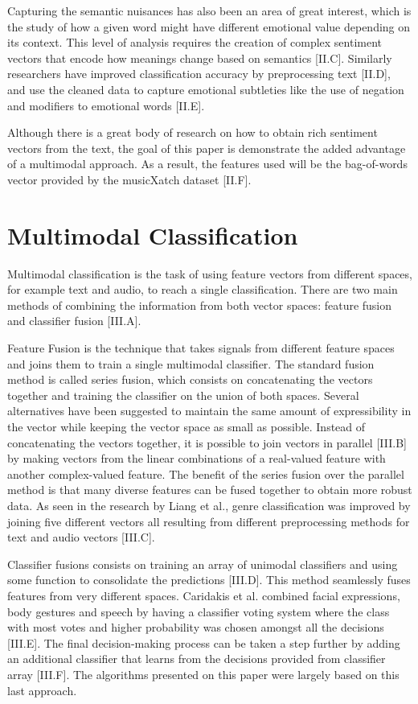 Capturing the semantic nuisances has also been an area of great interest, which is 
the study of how a given word might have different emotional value depending on its 
context. This level of analysis requires the creation of complex sentiment vectors 
that encode how meanings change based on semantics [II.C].  Similarly researchers 
have improved classification accuracy by preprocessing text [II.D], and use the 
cleaned data to capture emotional subtleties like the use of negation and modifiers 
to emotional words [II.E]. 

Although there is a great body of research on how to obtain rich sentiment vectors 
from the text, the goal of this paper is demonstrate the added advantage of a 
multimodal approach. As a result, the features used will be the bag-of-words vector 
provided by the musicXatch dataset [II.F].

\section{Multimodal Classification}

Multimodal classification is the task of using feature vectors from different spaces, 
for example text and audio, to reach a single classification. There are two main 
methods of combining the information from both vector spaces: feature fusion and 
classifier fusion [III.A]. 

Feature Fusion is the technique that takes signals from different 
feature spaces and joins them to train a single multimodal classifier. The standard 
fusion method is called series fusion, which consists on concatenating the vectors 
together and training the classifier on the union of both spaces. Several alternatives 
have been suggested to maintain the same amount of expressibility in the vector while 
keeping the vector space as small as possible. Instead of concatenating the vectors 
together, it is possible to join vectors in parallel [III.B] by making vectors from the linear
combinations of a real-valued feature with another complex-valued feature. The benefit 
of the series fusion over the parallel method is that many diverse features can be fused
together to obtain more robust data. As seen in the research by Liang et al., 
genre classification was improved by joining five different vectors all resulting from 
different preprocessing methods for text and audio vectors [III.C]. 

Classifier fusions consists on training an array of unimodal classifiers and using some 
function to consolidate the predictions [III.D]. This method seamlessly fuses features 
from very different spaces. Caridakis et al. combined facial expressions, body gestures 
and speech by having a classifier voting system where the class with most votes and 
higher probability was chosen amongst all the decisions [III.E]. The final decision-making 
process can be taken a step further by adding an additional classifier that learns from 
the decisions provided from classifier array [III.F].  The algorithms presented on this 
paper were largely based on this last approach. 



